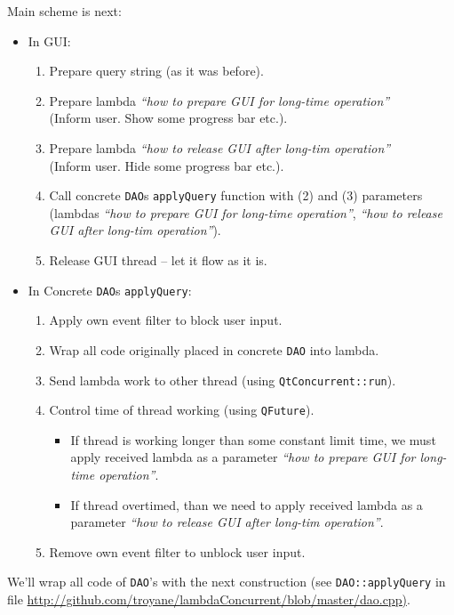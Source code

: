 \documentclass[a4paper,12pt]{scrartcl}
\begin{document}
Main scheme is next:
\begin{itemize}
 \item In GUI:
 \begin{enumerate}
  \item Prepare query string (as it was before).
  \item Prepare lambda \textit{``how to prepare GUI for long-time operation''} \\(Inform user. Show some progress bar etc.).
  \item Prepare lambda \textit{``how to release GUI after long-tim operation''} \\(Inform user. Hide some progress bar etc.).
  \item Call concrete \texttt{DAO}s \texttt{applyQuery} function with (2) and (3) parameters (lambdas 
    \textit{``how to prepare GUI for long-time operation''}, \textit{``how to release GUI after long-tim operation''}).
  \item Release GUI thread -- let it flow as it is.
 \end{enumerate}
 \item In Concrete \texttt{DAO}s \texttt{applyQuery}:
 \begin{enumerate}
  \item Apply own event filter to block user input.
  \item Wrap all code originally placed in concrete \texttt{DAO} into lambda.
  \item Send lambda work to other thread (using \texttt{QtConcurrent::run}).
  \item Control time of thread working (using \texttt{QFuture}).
  \begin{itemize}
   \item If thread is working longer than some constant limit time, we must apply received lambda as a parameter 
    \textit{``how to prepare GUI for long-time operation''}.
   \item If thread overtimed, than we need to apply received lambda as a parameter \textit{``how to release GUI after long-tim operation''}.
  \end{itemize}
  \item Remove own event filter to unblock user input.
 \end{enumerate}
\end{itemize}

We'll wrap all code of \texttt{DAO}'s with the next construction (see \texttt{DAO::applyQuery} in file 
\url{http://github.com/troyane/lambdaConcurrent/blob/master/dao.cpp)}.
\end{document}
